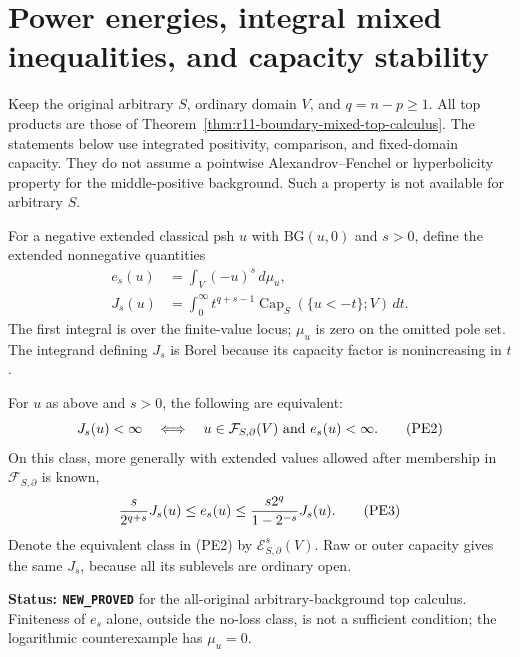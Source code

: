 \section{Power energies, integral mixed inequalities, and capacity stability}
\label{sec:r11-power-energy-stability}

Keep the original arbitrary $S$, ordinary domain $V$, and $q=n-p\geq1$.
All top products are those of
Theorem~\ref{thm:r11-boundary-mixed-top-calculus}. The statements
below use integrated positivity, comparison, and fixed-domain
capacity. They do not assume a pointwise Alexandrov--Fenchel or
hyperbolicity property for the middle-positive background. Such a
property is not available for arbitrary $S$.

For a negative extended classical psh $u$ with $\mathrm{BG}(u,0)$
and $s>0$, define the extended nonnegative quantities
\[
 \begin{split}
 e_s(u)&=\int_V(-u)^s\,d\mu_u,\\
 J_s(u)&=\int_0^\infty t^{q+s-1}
                       \operatorname{Cap}_S(\{u<-t\};V)\,dt.
 \end{split}
 \tag{PE1}
\]
The first integral is over the finite-value locus; $\mu_u$ is zero
on the omitted pole set. The integrand defining $J_s$ is Borel
because its capacity factor is nonincreasing in $t$.

\begin{theorem}
\label{thm:r11-power-energy-capacity-equivalence}
For $u$ as above and $s>0$, the following are equivalent:
\[
 J_s(u)<\infty
 \quad\Longleftrightarrow\quad
 u\in\mathcal F_{S,\partial}(V)\ \hbox{and}\ e_s(u)<\infty.
 \tag{PE2}
\]
On this class, more generally with extended values allowed after
membership in $\mathcal F_{S,\partial}$ is known,
\[
 {s\over2^{q+s}}J_s(u)
       \leq e_s(u)
       \leq {s2^q\over1-2^{-s}}J_s(u).
 \tag{PE3}
\]
Denote the equivalent class in (PE2) by
$\mathcal E^s_{S,\partial}(V)$. Raw or outer capacity gives the
same $J_s$, because all its sublevels are ordinary open.
\end{theorem}

\noindent\textbf{Status: \texttt{NEW\_PROVED}} for the
all-original arbitrary-background top calculus. Finiteness of
$e_s$ alone, outside the no-loss class, is not a sufficient
condition; the logarithmic counterexample has $\mu_u=0$.

